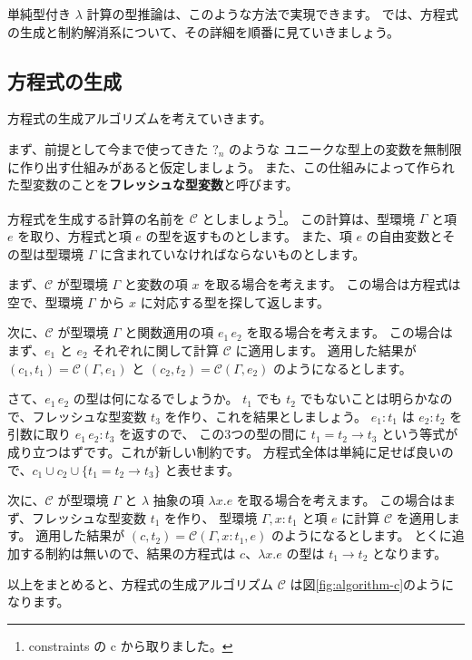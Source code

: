単純型付き $\lambda$ 計算の型推論は、このような方法で実現できます。
では、方程式の生成と制約解消系について、その詳細を順番に見ていきましょう。

\subsection{方程式の生成}

方程式の生成アルゴリズムを考えていきます。

まず、前提として今まで使ってきた $?_n$ のような
ユニークな型上の変数を無制限に作り出す仕組みがあると仮定しましょう。
また、この仕組みによって作られた型変数のことを\textbf{フレッシュな型変数}と呼びます。

方程式を生成する計算の名前を $\mathcal C$ としましょう\footnote{constraints の c から取りました。}。
この計算は、型環境 $\Gamma$ と項 $e$ を取り、方程式と項 $e$ の型を返すものとします。
また、項 $e$ の自由変数とその型は型環境 $\Gamma$ に含まれていなければならないものとします。

まず、$\mathcal C$ が型環境 $\Gamma$ と変数の項 $x$ を取る場合を考えます。
この場合は方程式は空で、型環境 $\Gamma$ から $x$ に対応する型を探して返します。

次に、$\mathcal C$ が型環境 $\Gamma$ と関数適用の項 $e_1 \, e_2$ を取る場合を考えます。
この場合はまず、$e_1$ と $e_2$ それぞれに関して計算 $\mathcal C$ に適用します。
適用した結果が $(c_1, t_1) = \mathcal{C}(\Gamma, e_1)$ と $(c_2, t_2) = \mathcal{C}(\Gamma, e_2)$
のようになるとします。

さて、$e_1 \, e_2$ の型は何になるでしょうか。
$t_1$ でも $t_2$ でもないことは明らかなので、フレッシュな型変数 $t_3$ を作り、これを結果としましょう。
$e_1 : t_1$ は $e_2 : t_2$ を引数に取り $e_1 \, e_2 : t_3$ を返すので、
この3つの型の間に $t_1 = t_2 \to t_3$ という等式が成り立つはずです。これが新しい制約です。
方程式全体は単純に足せば良いので、$c_1 \cup c_2 \cup \{t_1 = t_2 \to t_3\}$ と表せます。

次に、$\mathcal C$ が型環境 $\Gamma$ と $\lambda$ 抽象の項 $\lambda x . e$ を取る場合を考えます。
この場合はまず、フレッシュな型変数 $t_1$ を作り、
型環境 $\Gamma, x : t_1$ と項 $e$ に計算 $\mathcal C$ を適用します。
適用した結果が $(c, t_2) = \mathcal{C}(\Gamma, x : t_1, e)$ のようになるとします。
とくに追加する制約は無いので、結果の方程式は $c$、$\lambda x . e$ の型は $t_1 \to t_2$ となります。

以上をまとめると、方程式の生成アルゴリズム $\mathcal C$ は図\ref{fig:algorithm-c}のようになります。

